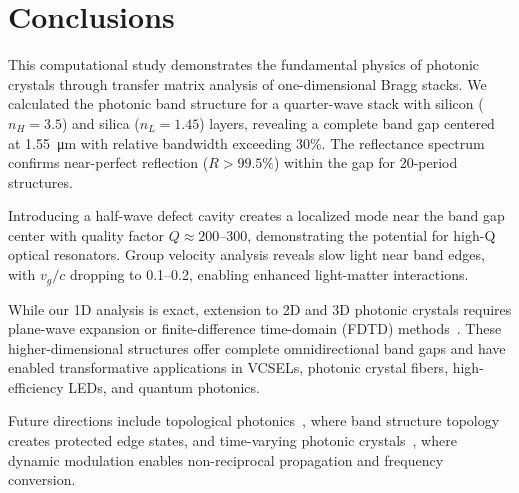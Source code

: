 \documentclass[11pt,a4paper]{article}
\begin{document}
\section{Conclusions}

This computational study demonstrates the fundamental physics of photonic crystals through transfer matrix analysis of one-dimensional Bragg stacks. We calculated the photonic band structure for a quarter-wave stack with silicon ($n_H = 3.5$) and silica ($n_L = 1.45$) layers, revealing a complete band gap centered at \SI{1.55}{\micro\meter} with relative bandwidth exceeding 30\%. The reflectance spectrum confirms near-perfect reflection ($R > 99.5\%$) within the gap for 20-period structures.

Introducing a half-wave defect cavity creates a localized mode near the band gap center with quality factor $Q \approx 200$--300, demonstrating the potential for high-Q optical resonators. Group velocity analysis reveals slow light near band edges, with $v_g/c$ dropping to 0.1--0.2, enabling enhanced light-matter interactions.

While our 1D analysis is exact, extension to 2D and 3D photonic crystals requires plane-wave expansion or finite-difference time-domain (FDTD) methods~\cite{Joannopoulos2008}. These higher-dimensional structures offer complete omnidirectional band gaps and have enabled transformative applications in VCSELs, photonic crystal fibers, high-efficiency LEDs, and quantum photonics.

Future directions include topological photonics~\cite{Ozawa2019}, where band structure topology creates protected edge states, and time-varying photonic crystals~\cite{Lustig2019}, where dynamic modulation enables non-reciprocal propagation and frequency conversion.
\end{document}
